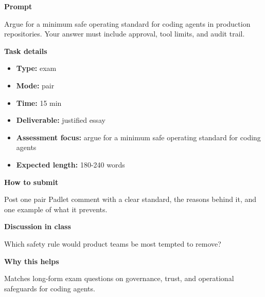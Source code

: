 \documentclass[11pt]{article}
\begin{document}
\begin{tcolorbox}[colback=white,colframe=MidnightBlue,title={Q5 Exam-Style Constructed Response},fonttitle=\bfseries,breakable]
\begin{center}
\end{center}

{\large\bfseries\color{MidnightBlue} Prompt}\par\medskip
Argue for a minimum safe operating standard for coding agents in production repositories. Your answer must include approval, tool limits, and audit trail.

{\large\bfseries\color{MidnightBlue} Task details}\par\medskip
\begin{itemize}\item \textbf{Type:} exam
\item \textbf{Mode:} pair
\item \textbf{Time:} 15 min
\item \textbf{Deliverable:} justified essay
\item \textbf{Assessment focus:} argue for a minimum safe operating standard for coding agents
\item \textbf{Expected length:} 180-240 words\end{itemize}

{\large\bfseries\color{MidnightBlue} How to submit}\par\medskip
Post one pair Padlet comment with a clear standard, the reasons behind it, and one example of what it prevents.

{\large\bfseries\color{MidnightBlue} Discussion in class}\par\medskip
Which safety rule would product teams be most tempted to remove?

{\large\bfseries\color{MidnightBlue} Why this helps}\par\medskip
Matches long-form exam questions on governance, trust, and operational safeguards for coding agents.


\end{tcolorbox}
\end{document}
